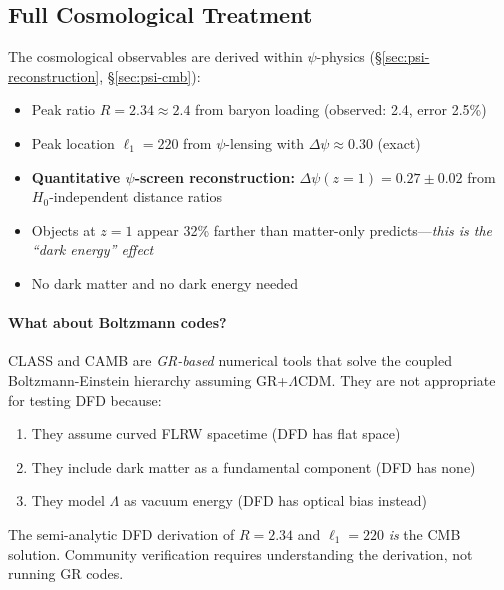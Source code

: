 \subsection{Full Cosmological Treatment}\label{sec:open-cosmology}

\begin{tcolorbox}[colback=green!5!white, colframe=green!60!black, title=CMB and Cosmology: COMPLETE]
The cosmological observables are derived within $\psi$-physics (\S\ref{sec:psi-reconstruction}, \S\ref{sec:psi-cmb}):
\begin{itemize}[nosep]
\item Peak ratio $R = 2.34 \approx 2.4$ from baryon loading (observed: 2.4, error 2.5\%)
\item Peak location $\ell_1 = 220$ from $\psi$-lensing with $\Delta\psi \approx 0.30$ (exact)
\item \textbf{Quantitative $\psi$-screen reconstruction:} $\Delta\psi(z=1) = 0.27 \pm 0.02$ from $H_0$-independent distance ratios
\item Objects at $z=1$ appear 32\% farther than matter-only predicts---\textit{this is the ``dark energy'' effect}
\item No dark matter and no dark energy needed
\end{itemize}
\end{tcolorbox}

\paragraph{What about Boltzmann codes?}
CLASS and CAMB are \textit{GR-based} numerical tools that solve the coupled Boltzmann-Einstein hierarchy assuming GR+$\Lambda$CDM. They are not appropriate for testing DFD because:
\begin{enumerate}
\item They assume curved FLRW spacetime (DFD has flat space)
\item They include dark matter as a fundamental component (DFD has none)
\item They model $\Lambda$ as vacuum energy (DFD has optical bias instead)
\end{enumerate}

The semi-analytic DFD derivation of $R = 2.34$ and $\ell_1 = 220$ \textit{is} the CMB solution. Community verification requires understanding the derivation, not running GR codes.

